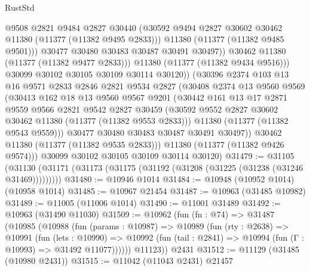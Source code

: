 \begin{lexlean}{RustStd}
\begin{coremodule}
                      @9508
                      @2821
                      @9484
                      @2827
                      @30440
                      (@30592 @9494 @2827 @30602 @30462 @11380 (@11377 (@11382 @9495 @2833)))
                      @11380
                      (@11377 (@11382 @9485 @9501)))
                    @30477
                    @30480
                    @30483
                    @30487
                    @30491
                    @30497))
                @30462
                @11380
                (@11377 (@11382 @9477 @2833)))
              @11380
              (@11377 (@11382 @9434 @9516)))
            @30099
            @30102
            @30105
            @30109
            @30114
            @30120))
        (@30396
          @2374
          @103
          @13
          @16
          @9571
          @2833
          @2846
          @2821
          @9534
          @2827
          (@30408
            @2374
            @13
            @9560
            @9569
            (@30413
              @162
              @18
              @13
              @9560
              @9567
              @9201
              (@30442
                @161
                @13
                @17
                @2871
                @9559
                @9566
                @2821
                @9542
                @2827
                @30459
                (@30592 @9552 @2827 @30602 @30462 @11380 (@11377 (@11382 @9553 @2833)))
                @11380
                (@11377 (@11382 @9543 @9559)))
              @30477
              @30480
              @30483
              @30487
              @30491
              @30497))
          @30462
          @11380
          (@11377 (@11382 @9535 @2833)))
        @11380
        (@11377 (@11382 @9426 @9574)))
      @30099
      @30102
      @30105
      @30109
      @30114
      @30120)
@31479 := @31105
    (@31130 (@31171 (@31173 (@31175 (@31192 (@31208 (@31225 (@31238 (@31246 @31469)))))))))
@31480 := @10946 @1014
@31484 := @10948 (@10952 @1014) (@10958 @1014)
@31485 := @10967 @21454
@31487 := @10963 (@31485 @10982)
@31489 := @11005 (@11006 @1014)
@31490 := @11001 @31489
@31492 := @10963 (@31490 @11030)
@31509 := @10962
    (fun (fn : @74) =>
    @31487
      (@10985
        (@10988
          (fun (params : @10987) =>
          @10989
            (fun (rty : @2638) =>
            @10991
              (fun (lets : @10990) =>
              @10992 (fun (tail : @2841) => @10994 (fun (Γ : @10993) => @31492 @11077))))))
        @11123))
    @2431
@31512 := @11129 (@31485 (@10980 @2431))
@31515 := @11042 (@11043 @2431) @21457

\end{coremodule}
\end{lexlean}

